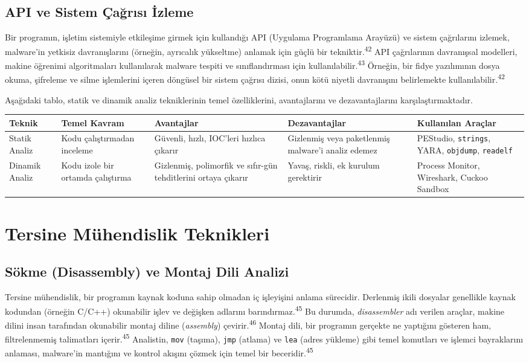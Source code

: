 \subsection{API ve Sistem Çağrısı İzleme}

Bir programın, işletim sistemiyle etkileşime girmek için kullandığı API (Uygulama Programlama Arayüzü) ve sistem çağrılarını izlemek, malware'in yetkisiz davranışlarını (örneğin, ayrıcalık yükseltme) anlamak için güçlü bir tekniktir.\textsuperscript{42} API çağrılarının davranışsal modelleri, makine öğrenimi algoritmaları kullanılarak malware tespiti ve sınıflandırması için kullanılabilir.\textsuperscript{43} Örneğin, bir fidye yazılımının dosya okuma, şifreleme ve silme işlemlerini içeren döngüsel bir sistem çağrısı dizisi, onun kötü niyetli davranışını belirlemekte kullanılabilir.\textsuperscript{42}

Aşağıdaki tablo, statik ve dinamik analiz tekniklerinin temel özelliklerini, avantajlarını ve dezavantajlarını karşılaştırmaktadır.

\begin{longtable}{|l|p{3.5cm}|p{4cm}|p{4cm}|p{3.5cm}|}
\hline
\textbf{Teknik} & \textbf{Temel Kavram} & \textbf{Avantajlar} & \textbf{Dezavantajlar} & \textbf{Kullanılan Araçlar} \\
\hline
Statik Analiz & Kodu çalıştırmadan inceleme & Güvenli, hızlı, IOC'leri hızlıca çıkarır & Gizlenmiş veya paketlenmiş malware'i analiz edemez & PEStudio, \texttt{strings}, YARA, \texttt{objdump}, \texttt{readelf} \\
\hline
Dinamik Analiz & Kodu izole bir ortamda çalıştırma & Gizlenmiş, polimorfik ve sıfır-gün tehditlerini ortaya çıkarır & Yavaş, riskli, ek kurulum gerektirir & Process Monitor, Wireshark, Cuckoo Sandbox \\
\hline
\end{longtable}

\section{Tersine Mühendislik Teknikleri}

\subsection{Sökme (Disassembly) ve Montaj Dili Analizi}

Tersine mühendislik, bir programın kaynak koduna sahip olmadan iç işleyişini anlama sürecidir. Derlenmiş ikili dosyalar genellikle kaynak kodundan (örneğin C/C++) okunabilir işlev ve değişken adlarını barındırmaz.\textsuperscript{45} Bu durumda, \textit{disassembler} adı verilen araçlar, makine dilini insan tarafından okunabilir montaj diline (\textit{assembly}) çevirir.\textsuperscript{46} Montaj dili, bir programın gerçekte ne yaptığını gösteren ham, filtrelenmemiş talimatları içerir.\textsuperscript{45} Analistin, \texttt{mov} (taşıma), \texttt{jmp} (atlama) ve \texttt{lea} (adres yükleme) gibi temel komutları ve işlemci bayraklarını anlaması, malware'in mantığını ve kontrol akışını çözmek için temel bir beceridir.\textsuperscript{45}

